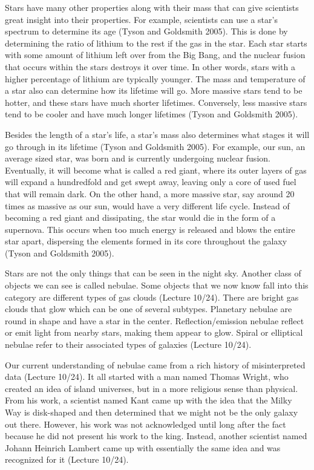 \documentclass[12pt]{article}
\begin{document}
Stars have many other properties along with their mass that can give scientists
great insight into their properties.  For example, scientists can use a star's
spectrum to determine its age (Tyson and Goldsmith 2005).  This is done by
determining the ratio of lithium
to the rest if the gas in the star.  Each star starts with some amount of
lithium left over from the Big Bang, and the nuclear fusion that occurs within
the stars destroys it over time.  In other words, stars with a higher percentage
of lithium are typically younger.  The mass and temperature of a star also can
determine how its lifetime will go.  More massive stars tend to be hotter, and
these stars have much shorter lifetimes.  Conversely, less massive stars tend to
be cooler and have much longer lifetimes (Tyson and Goldsmith 2005).

Besides the length of a star's life, a star's mass also determines what stages
it will go through in its lifetime (Tyson and Goldsmith 2005).  For example, our
sun, an average sized star,
was born and is currently undergoing nuclear fusion.  Eventually, it will become
what is called a red giant, where its outer layers of gas will expand a
hundredfold and get swept away, leaving only a core of used fuel that will
remain dark.  On the other hand, a more massive star, say around 20 times as
massive as our sun, would have a very different life cycle.  Instead of becoming
a red giant and dissipating, the star would die in the form of a supernova.
This occurs when too much energy is released and blows the entire star apart,
dispersing the elements formed in its core throughout the galaxy (Tyson and
Goldsmith 2005).

Stars are not the only things that can be seen in the night sky.  Another class
of objects we can see is called nebulae.  Some objects that we now know fall
into this category are different types of gas clouds (Lecture 10/24).  There are
bright gas
clouds that glow which can be one of several subtypes.  Planetary nebulae are
round in shape and have a star in the center.  Reflection/emission nebulae
reflect or emit light from nearby stars, making them appear to glow.  Spiral or
elliptical nebulae refer to their associated types of galaxies (Lecture 10/24).

Our current understanding of nebulae came from a rich history of misinterpreted
data (Lecture 10/24).  It all started with a man named Thomas Wright, who created
an idea of
island universes, but in a more religious sense than physical.  From his work, a
scientist named Kant came up with the idea that the Milky Way is disk-shaped and
then determined that we might not be the only galaxy out there.  However, his
work was not acknowledged until long after the fact because he did not present
his work to the king.  Instead, another scientist named Johann Heinrich Lambert
came up with essentially the same idea and was recognized for it (Lecture 10/24).
\end{document}
